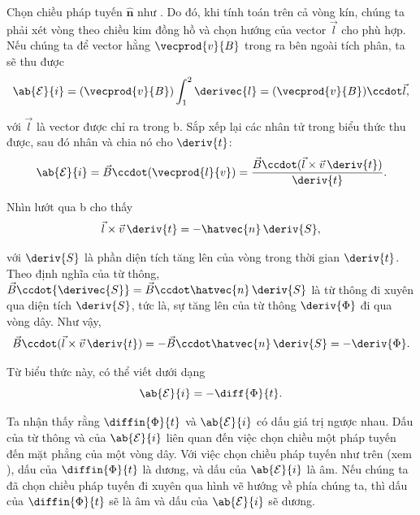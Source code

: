 Chọn chiều pháp tuyến $\hat{\boldsymbol{n}}$ như .
Do đó, khi tính toán trên cả vòng kín, chúng ta phải xét vòng theo chiều kim đồng hồ và chọn hướng của vector $\vec{l}$ cho phù hợp.
Nếu chúng ta để vector hằng $\vecprod{v}{B}$ trong  ra bên ngoài tích phân, ta sẽ thu được
\begin{equation*}
    \ab{\mathcal{E}}{i} = (\vecprod{v}{B}) \int_1^2 \derivec{l} = (\vecprod{v}{B}) \ccdot \vec{l},
\end{equation*}

\noindent
với $\vec{l}$ là vector được chỉ ra trong b.
Sắp xếp lại các nhân tử trong biểu thức thu được, sau đó nhân và chia nó cho $\deriv{t}$:
\begin{equation}\label{eq:8_3}
    \ab{\mathcal{E}}{i} = \vec{B} \ccdot (\vecprod{l}{v}) = \frac{\vec{B} \ccdot (\vec{l} \times \vec{v}\, \deriv{t})}{\deriv{t}}.
\end{equation}

\noindent
Nhìn lướt qua  b cho thấy 
\begin{equation*}
    \vec{l} \times \vec{v}\, \deriv{t} = - \hatvec{n}\, \deriv{S},
\end{equation*}

\noindent
với $\deriv{S}$ là phần diện tích tăng lên của vòng trong thời gian $\deriv{t}$.
Theo định nghĩa của từ thông,
$\vec{B}\ccdot{\derivec{S}}=\vec{B}\ccdot\hatvec{n}\,\deriv{S}$ là từ thông đi xuyên qua diện tích $\deriv{S}$, tức là, sự tăng lên của từ thông $\deriv{\Phi}$ đi qua vòng dây.
Như vậy,
\begin{equation*}
    \vec{B} \ccdot (\vec{l} \times \vec{v}\, \deriv{t}) = - \vec{B} \ccdot \hatvec{n}\, \deriv{S} = - \deriv{\Phi}.
\end{equation*}

\noindent
Từ biểu thức này,  có thể viết dưới dạng
\begin{equation}\label{eq:8_4}
    \ab{\mathcal{E}}{i} = - \diff{\Phi}{t}.
\end{equation}

Ta nhận thấy rằng $\diffin{\Phi}{t}$ và $\ab{\mathcal{E}}{i}$ có dấu giá trị ngược nhau.
Dấu của từ thông và của $\ab{\mathcal{E}}{i}$ liên quan đến việc chọn chiều một pháp tuyến đến mặt phẳng của một vòng dây.
Với việc chọn chiều pháp tuyến như trên (xem ), dấu của $\diffin{\Phi}{t}$ là dương, và dấu của $\ab{\mathcal{E}}{i}$ là âm.
Nếu chúng ta đã chọn chiều pháp tuyến đi xuyên qua hình vẽ hướng về phía chúng ta, thì dấu của $\diffin{\Phi}{t}$ sẽ là âm và dấu của $\ab{\mathcal{E}}{i}$ sẽ dương.

